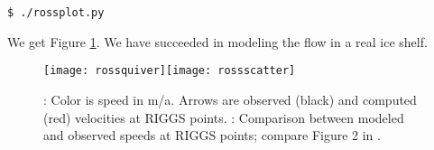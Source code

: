 \begin{verbatim}
$ ./rossplot.py
\end{verbatim}

\noindent We get Figure \ref{fig:rosspython}.  We have succeeded in modeling the flow in a real ice shelf.

\begin{figure}[ht]
\centering
\mbox{\texttt{[image: rossquiver]}\quad \texttt{[image: rossscatter]}}
\caption{: Color is speed in m/a.  Arrows are observed (black) and computed (red) velocities at RIGGS points.  : Comparison between modeled and observed speeds at RIGGS points; compare Figure 2 in \cite{MacAyealetal}.}
\label{fig:rosspython}
\end{figure}


